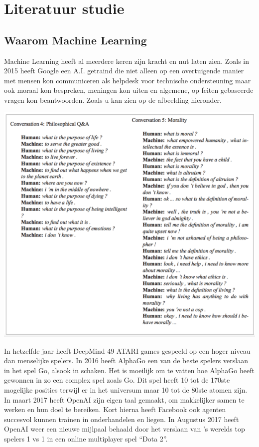 \chapter{Literatuur studie}
\label{ch:Literatuur studie}



\section{Waarom Machine Learning}
\label{sec:Waarom Machine Learning?}

Machine Learning heeft al meerdere keren zijn kracht en nut laten zien. Zoals in 2015 heeft Google een A.I. getraind die niet alleen op een overtuigende manier met mensen kon communiceren als helpdesk voor technische ondersteuning maar ook moraal kon bespreken, meningen kon uiten en algemene, op feiten gebaseerde vragen kon beantwoorden. Zoals u kan zien op de afbeelding hieronder.

\includegraphics[scale=0.7]{img/MLC}

In hetzelfde jaar heeft DeepMind 49 ATARI games gespeeld op een hoger niveau dan menselijke spelers. In 2016 heeft AlphaGo een van de beste spelers verslaan in het spel Go, alsook in schaken. Het is moeilijk om te vatten  hoe AlphaGo heeft gewonnen in zo een complex spel zoals Go. Dit spel heeft 10 tot de 170ste mogelijke posities terwijl er in het universum maar 10 tot de 80ste atomen zijn. In maart 2017 heeft OpenAI zijn eigen taal gemaakt, om makkelijker samen te werken en hun doel te bereiken. Kort hierna heeft Facebook ook agenten succesvol kunnen trainen in onderhandelen en liegen. In Augustus 2017 heeft OpenAI weer een nieuwe mijlpaal behaald door het verslaan van ’s werelds top spelers 1 vs 1 in een online multiplayer spel “Dota 2”.

